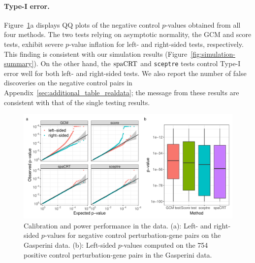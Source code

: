 \documentclass[12pt]{article}
\theoremstyle{definition}
\newcommand{\spacrt}{\textnormal{spaCRT}}               %
\begin{document}
  \paragraph{Type-I error.} Figure~\ref{fig:summary-real-data}a displays QQ plots of the negative control $p$-values obtained from all four methods. The two tests relying on asymptotic normality, the GCM and score tests, exhibit severe $p$-value inflation for left- and right-sided tests, respectively. This finding is consistent with our simulation results (Figure~\ref{fig:simulation-summary}). On the other hand, the $\spacrt$ and \verb|sceptre| tests control Type-I error well for both left- and right-sided tests. We also report the number of false discoveries on the negative control pairs in Appendix~\ref{sec:additional_table_realdata}; the message from these results are consistent with that of the single testing results.
  \begin{figure}[!ht]
	  \centering
	  \includegraphics[width=1.0\textwidth]{figures-and-tables/combined_summary.pdf}
	  \caption{\small{Calibration and power performance in the \citet{Gasperini2019a} data. (a): Left- and right-sided $p$-values for negative control perturbation-gene pairs on the Gasperini data. (b): Left-sided $p$-values computed on the 754 positive control perturbation-gene pairs in the Gasperini data.}}
	  \label{fig:summary-real-data}
  \end{figure}
  
\end{document}
